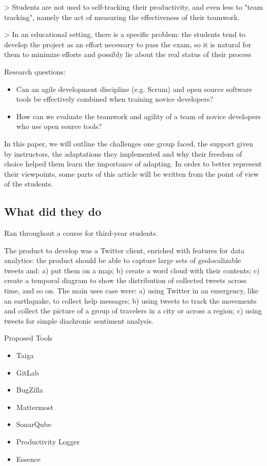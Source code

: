 > Students are not used to self-tracking their productivity, and even less to "team tracking", namely the act of measuring the effectiveness of their teamwork.

> In an educational setting, there is a specific problem: the students tend to develop the project as an effort necessary to pass the exam, so it is natural for them to minimize efforts and possibly lie about the real status of their process

Research questions:

\begin{itemize}
    \item Can an agile development discipline (e.g. Scrum) and open source software tools be effectively combined when training novice developers?
    \item How can we evaluate the teamwork and agility of a team of novice developers who use open source tools?
\end{itemize}


In this paper, we will outline the challenges one group faced, the support given by instructors, the adaptations they implemented and why their freedom of choice helped them learn the importance of adapting. In order to better represent their viewpoints, some parts of this article will be written from the point of view of the students.

\subsection{What did they do}

Ran throughout a course for third-year students.

The product to develop was a Twitter client, enriched with features for data
analytics: the product should be able to capture large sets of geolocalizable
tweets and: a) put them on a map; b) create a word cloud with their contents;
c) create a temporal diagram to show the distribution of collected tweets across
time, and so on. The main uses case were: a) using Twitter in an emergency, like
an earthquake, to collect help messages; b) using tweets to track the movements
and collect the picture of a group of travelers in a city or across a region; c)
using tweets for simple diachronic sentiment analysis.

Proposed Tools

\begin{itemize}
    \item Taiga
    \item GitLab
    \item BugZilla
    \item Mattermost
    \item SonarQube
    \item Productivity Logger
    \item Essence
\end{itemize}

